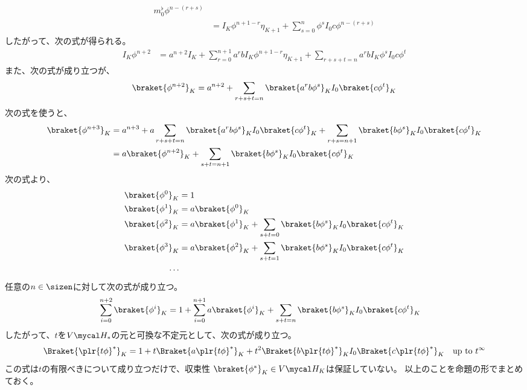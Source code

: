 {\begin{equation}
\begin{split}
			m_0^\flat\phi^{n-(r+s)} \\
		&= I_K\phi^{n+1-r}\eta_{K+1} + \sum_{s=0}^n\phi^sI_0c\phi^{n-(r+s)}
	\end{split}\end{equation}
	したがって、次の式が得られる。
	\begin{equation*}\begin{split}
		I_K\phi^{n+2} &= a^{n+2}I_K 
			+ \sum_{r=0}^{n+1} a^rbI_K\phi^{n+1-r}\eta_{K+1}
			+ \sum_{r+s+t=n} a^rbI_K\phi^sI_0c\phi^t
	\end{split}\end{equation*}
	また、次の式が成り立つが、
	\begin{equation*}\begin{split}
		\braket{\phi^{n+2}}_K = a^{n+2} 
			+ \sum_{r+s+t=n} \braket{a^rb\phi^s}_KI_0\braket{c\phi^t}_K
	\end{split}\end{equation*}
	次の式を使うと、
	\begin{equation*}\begin{split}
		\braket{\phi^{n+3}}_K &= a^{n+3} + a\sum_{r+s+t=n}
			\braket{a^rb\phi^s}_KI_0\braket{c\phi^t}_K
			+ \sum_{r+s=n+1} \braket{b\phi^s}_KI_0\braket{c\phi^t}_K \\
		&= a\braket{\phi^{n+2}}_K + \sum_{s+t=n+1}
			\braket{b\phi^s}_KI_0\braket{c\phi^t}_K
	\end{split}\end{equation*}
	次の式より、
	\begin{equation*}\begin{split}
		\braket{\phi^0}_K &= 1 \\ 
		\braket{\phi^1}_K &= a\braket{\phi^0}_K \\ 
		\braket{\phi^2}_K &= a\braket{\phi^1}_K
			+ \sum_{s+t=0} \braket{b\phi^s}_KI_0\braket{c\phi^t}_K \\
		\braket{\phi^3}_K &= a\braket{\phi^2}_K 
			+ \sum_{s+t=1} \braket{b\phi^s}_KI_0\braket{c\phi^t}_K \\
		\cdots \\
	\end{split}\end{equation*}
	任意の$n\in\sizen$に対して次の式が成り立つ。
	\begin{equation*}\begin{split}
		\sum_{i=0}^{n+2} \braket{\phi^i}_K &= 1 
			+ \sum_{i=0}^{n+1} a\braket{\phi^i}_K 
			+ \sum_{s+t=n} \braket{b\phi^s}_KI_0\braket{c\phi^t}_K
	\end{split}\end{equation*}
	したがって、$t$を$V\Eta_*$の元と可換な不定元として、次の式が成り立つ。
	\begin{equation*}\begin{split}
		\Braket{\plr{t\phi}^*}_K = 1 + t\Braket{a\plr{t\phi}^*}_K 
			+ t^2\Braket{b\plr{t\phi}^*}_KI_0\Braket{c\plr{t\phi}^*}_K 
			\quad\text{up to } t^\infty
	\end{split}\end{equation*}
	この式は$t$の有限べきについて成り立つだけで、収束性
	$\braket{\phi^*}_K\in V\Eta_K$は保証していない。
	以上のことを命題の形でまとめておく。

}

